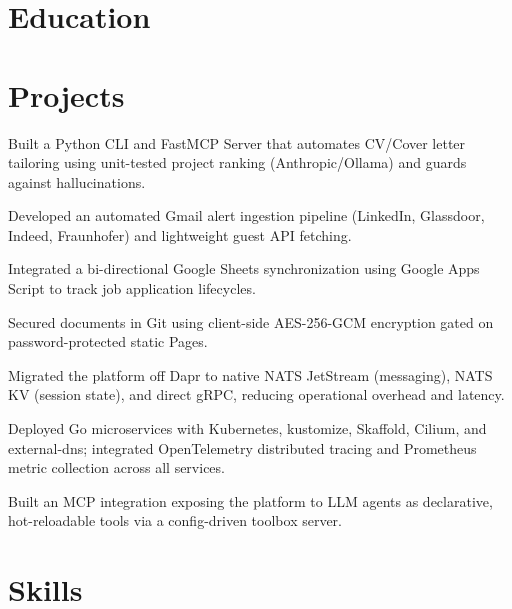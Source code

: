 \documentclass[10pt,a4paper]{resume}
\begin{document}
\section{Education}

\vspace{2pt}

\section{Projects}

\bullets
  \item Built a Python CLI and FastMCP Server that automates CV/Cover letter tailoring using unit-tested project ranking (Anthropic/Ollama) and guards against hallucinations.
  \item Developed an automated Gmail alert ingestion pipeline (LinkedIn, Glassdoor, Indeed, Fraunhofer) and lightweight guest API fetching.
  \item Integrated a bi-directional Google Sheets synchronization using Google Apps Script to track job application lifecycles.
  \item Secured documents in Git using client-side AES-256-GCM encryption gated on password-protected static Pages.
\bulletsend
\vspace{1.0pt}
\bullets
  \item Migrated the platform off Dapr to native NATS JetStream (messaging), NATS KV (session state), and direct gRPC, reducing operational overhead and latency.
  \item Deployed Go microservices with Kubernetes, kustomize, Skaffold, Cilium, and external-dns; integrated OpenTelemetry distributed tracing and Prometheus metric collection across all services.
  \item Built an MCP integration exposing the platform to LLM agents as declarative, hot-reloadable tools via a config-driven toolbox server.
\bulletsend

\section{Skills}
\end{document}
